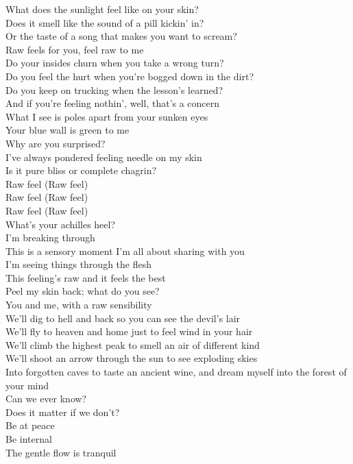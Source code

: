 What does the sunlight feel like on your skin? \\
Does it smell like the sound of a pill kickin' in? \\
Or the taste of a song that makes you want to scream? \\
Raw feels for you, feel raw to me \\

Do your insides churn when you take a wrong turn? \\
Do you feel the hurt when you're bogged down in the dirt? \\
Do you keep on trucking when the lesson's learned? \\
And if you're feeling nothin', well, that's a concern \\

What I see is poles apart from your sunken eyes \\
Your blue wall is green to me \\
Why are you surprised? \\
I've always pondered feeling needle on my skin \\
Is it pure bliss or complete chagrin? \\

Raw feel (Raw feel) \\
Raw feel (Raw feel) \\
Raw feel (Raw feel) \\
What's your achilles heel? \\

I'm breaking through \\
This is a sensory moment I'm all about sharing with you \\
I'm seeing things through the flesh \\
This feeling's raw and it feels the best \\
Peel my skin back; what do you see? \\
You and me, with a raw sensibility \\

We'll dig to hell and back so you can see the devil's lair \\
We'll fly to heaven and home just to feel wind in your hair \\
We'll climb the highest peak to smell an air of different kind \\
We'll shoot an arrow through the sun to see exploding skies \\
Into forgotten caves to taste an ancient wine, and dream myself into the forest of your mind \\
Can we ever know? \\
Does it matter if we don't? \\
Be at peace \\
Be internal \\
The gentle flow is tranquil \\

